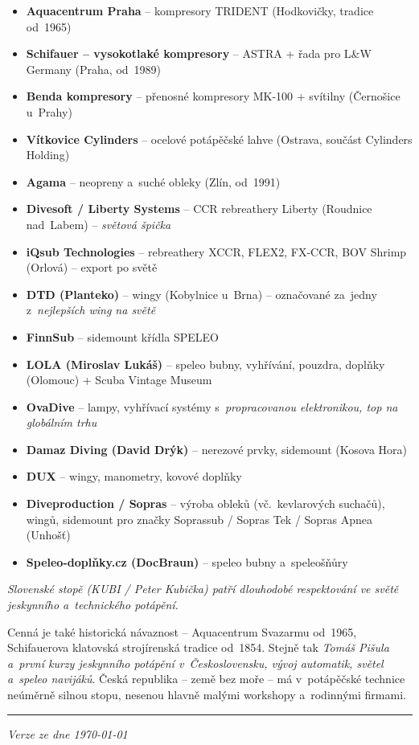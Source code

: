 \documentclass[11pt,a4paper]{article}
\begin{document}
\begin{itemize}
\item \textbf{Aquacentrum Praha} -- kompresory TRIDENT (Hodkovičky, tradice od~1965)
\item \textbf{Schifauer -- vysokotlaké kompresory} -- ASTRA + řada pro L\&W Germany (Praha, od~1989)
\item \textbf{Benda kompresory} -- přenosné kompresory MK-100 + svítilny (Černošice u~Prahy)
\item \textbf{Vítkovice Cylinders} -- ocelové potápěčské lahve (Ostrava, součást Cylinders Holding)
\item \textbf{Agama} -- neopreny a~suché obleky (Zlín, od~1991)
\item \textbf{Divesoft / Liberty Systems} -- CCR rebreathery Liberty (Roudnice nad~Labem) -- \emph{světová špička}
\item \textbf{iQsub Technologies} -- rebreathery XCCR, FLEX2, FX-CCR, BOV Shrimp (Orlová) -- export po světě
\item \textbf{DTD (Planteko)} -- wingy (Kobylnice u~Brna) -- označované za~jedny z~\emph{nejlepších wing na světě}
\item \textbf{FinnSub} -- sidemount křídla SPELEO
\item \textbf{LOLA (Miroslav Lukáš)} -- speleo bubny, vyhřívání, pouzdra, doplňky (Olomouc) + Scuba Vintage Museum
\item \textbf{OvaDive} -- lampy, vyhřívací systémy s~\emph{propracovanou elektronikou, top na globálním trhu}
\item \textbf{Damaz Diving (David Drýk)} -- nerezové prvky, sidemount (Kosova Hora)
\item \textbf{DUX} -- wingy, manometry, kovové doplňky
\item \textbf{Diveproduction / Sopras} -- výroba obleků (vč.~kevlarových suchačů), wingů, sidemount pro značky Soprassub / Sopras Tek / Sopras Apnea (Unhošť)
\item \textbf{Speleo-doplňky.cz (DocBraun)} -- speleo bubny a~speleošňůry
\end{itemize}

\textit{Slovenské stopě (KUBI / Peter Kubička) patří dlouhodobé respektování ve světě jeskynního a~technického potápění.}

\vspace{0.5em}

\noindent Cenná je také historická návaznost -- Aquacentrum Svazarmu od~1965, Schifauerova klatovská strojírenská tradice od~1854. Stejně tak \emph{Tomáš Pišula a~první kurzy jeskynního potápění v~Československu, vývoj automatik, světel a~speleo navijáků}. Česká republika -- země bez moře -- má v~potápěčské technice neúměrně silnou stopu, nesenou hlavně malými workshopy a~rodinnými firmami.

\vspace{1em}
\hrule
\vspace{0.5em}
\begin{center}
\small\itshape Verze ze dne \today
\end{center}
\end{document}

